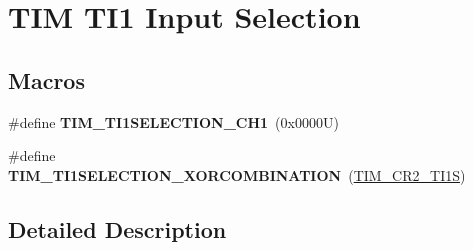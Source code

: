 \hypertarget{group___t_i_m___t_i1___selection}{}\section{T\+IM T\+I1 Input Selection}
\label{group___t_i_m___t_i1___selection}
\subsection*{Macros}
\begin{DoxyCompactItemize}
\item 
\mbox{\label{group___t_i_m___t_i1___selection_gace6563bccf7635461f660fbed6241488}} 
\#define {\bfseries T\+I\+M\+\_\+\+T\+I1\+S\+E\+L\+E\+C\+T\+I\+O\+N\+\_\+\+C\+H1}~(0x0000\+U)
\item 
\mbox{\label{group___t_i_m___t_i1___selection_ga40dfcb0e3f2fdf0f45cbba227106310a}} 
\#define {\bfseries T\+I\+M\+\_\+\+T\+I1\+S\+E\+L\+E\+C\+T\+I\+O\+N\+\_\+\+X\+O\+R\+C\+O\+M\+B\+I\+N\+A\+T\+I\+ON}~(\hyperlink{group___peripheral___registers___bits___definition_gad07504497b70af628fa1aee8fe7ef63c}{T\+I\+M\+\_\+\+C\+R2\+\_\+\+T\+I1S})
\end{DoxyCompactItemize}


\subsection{Detailed Description}
